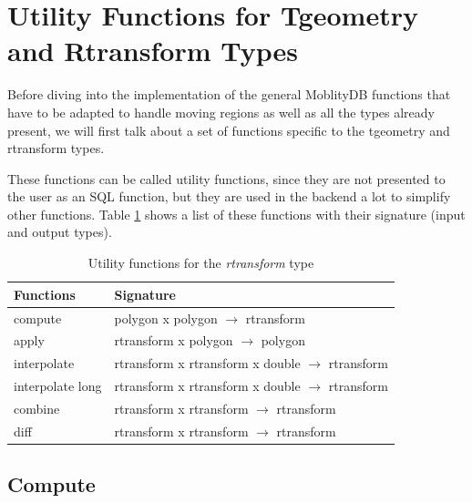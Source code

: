 
\newpage

\section{Utility Functions for Tgeometry and Rtransform Types}
\label{section:utility_rtransform}

Before diving into the implementation of the general MoblityDB functions that have to be adapted to handle moving regions as well as all the types already present, we will first talk about a set of functions specific to the tgeometry and rtransform types.

These functions can be called utility functions, since they are not presented to the user as an SQL function, but they are used in the backend a lot to simplify other functions. Table \ref{table:rtransform_functions} shows a list of these functions with their signature (input and output types).

\begin{table}[h!]
    \centering
    \begin{tabular}[c]{|l|l|} 
    \hline
    \textbf{Functions}  & \textbf{Signature} \\ 
    \hline
    compute             & polygon    x polygon              $\rightarrow$ rtransform \\
    apply               & rtransform x polygon              $\rightarrow$ polygon \\
    \hline
    interpolate         & rtransform x rtransform x double  $\rightarrow$ rtransform \\
    interpolate long    & rtransform x rtransform x double  $\rightarrow$ rtransform \\
    \hline
    combine             & rtransform x rtransform           $\rightarrow$ rtransform \\
    diff                & rtransform x rtransform           $\rightarrow$ rtransform \\
    \hline
    \end{tabular}
    \caption{Utility functions for the \textit{rtransform} type}
    \label{table:rtransform_functions}
\end{table}

\subsection{Compute}
\label{section:compute}

